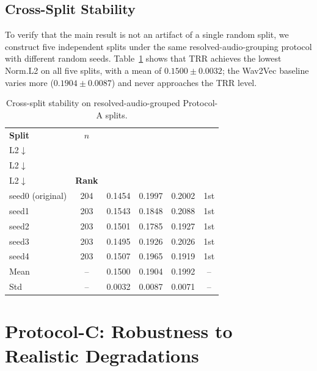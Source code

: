 \documentclass[journal,10pt]{IEEEtran}
\begin{document}
\subsection{Cross-Split Stability}

To verify that the main result is not an artifact of a single random split, we construct five independent splits under the same resolved-audio-grouping protocol with different random seeds. Table~\ref{tab:split_stability} shows that TRR achieves the lowest Norm.L2 on all five splits, with a mean of $0.1500 \pm 0.0032$; the Wav2Vec baseline varies more ($0.1904 \pm 0.0087$) and never approaches the TRR level.

\begin{table}[htbp]
\centering
\caption{Cross-split stability on resolved-audio-grouped Protocol-A splits.}
\label{tab:split_stability}
\footnotesize
\setlength{\tabcolsep}{3.5pt}
\begin{tabular}{lccccc}
\toprule
\textbf{Split} & \textbf{$n$} & \makecell{\textbf{TRR}\\L2$\downarrow$} & \makecell{\textbf{W2V}\\L2$\downarrow$} & \makecell{\textbf{FNN}\\L2$\downarrow$} & \textbf{Rank} \\
\midrule
seed0 (original) & 204 & 0.1454 & 0.1997 & 0.2002 & 1st \\
seed1 & 203 & 0.1543 & 0.1848 & 0.2088 & 1st \\
seed2 & 203 & 0.1501 & 0.1785 & 0.1927 & 1st \\
seed3 & 203 & 0.1495 & 0.1926 & 0.2026 & 1st \\
seed4 & 203 & 0.1507 & 0.1965 & 0.1919 & 1st \\
\midrule
Mean & -- & 0.1500 & 0.1904 & 0.1992 & -- \\
Std & -- & 0.0032 & 0.0087 & 0.0071 & -- \\
\bottomrule
\end{tabular}
\end{table}

\section{Protocol-C: Robustness to Realistic Degradations}
\end{document}
